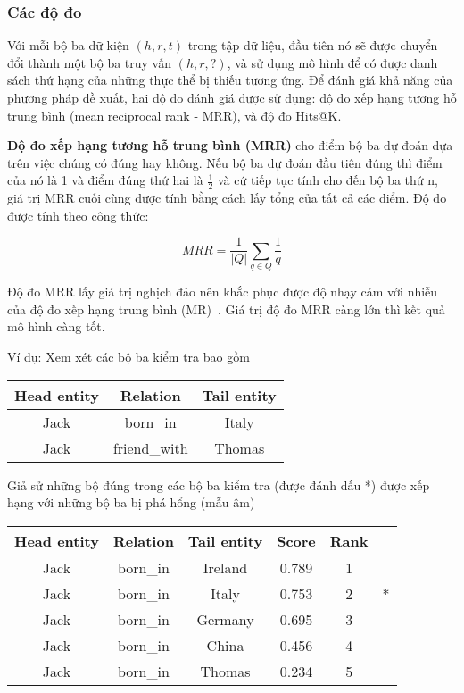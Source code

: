 \subsubsection{Các độ đo}

Với mỗi bộ ba dữ kiện $(h, r, t)$ trong tập dữ liệu, đầu tiên nó sẽ được chuyển đổi thành một bộ ba truy vấn $(h, r, ?)$, và sử dụng mô hình để có được danh sách thứ hạng của những thực thể bị thiếu tương ứng. Để đánh giá khả năng của phương pháp đề xuất, hai độ đo đánh giá được sử dụng: độ đo xếp hạng tương hỗ trung bình (mean reciprocal rank - MRR), và độ đo Hits@K.

\textbf{Độ đo xếp hạng tương hỗ trung bình (MRR)} cho điểm bộ ba dự đoán dựa trên việc chúng có đúng hay không. Nếu bộ ba dự đoán đầu tiên đúng thì điểm của nó là 1 và điểm đúng thứ hai là \(\frac{1}{2}\) và cứ tiếp tục tính cho đến bộ ba thứ n, giá trị MRR cuối cùng được tính bằng cách lấy tổng của tất cả các điểm. Độ đo được tính theo công thức:

\begin{equation}
\textit{MRR} = \frac{1}{|Q|} \sum_{q\in Q} \frac{1}{q}
\end{equation}

Độ đo MRR lấy giá trị nghịch đảo nên khắc phục được độ nhạy cảm với nhiễu của độ đo xếp hạng trung bình (MR)~\cite{talukdar2021okgit}. Giá trị độ đo MRR càng lớn thì kết quả mô hình càng tốt.

Ví dụ: Xem xét các bộ ba kiểm tra bao gồm

\begin{table}[H]
\centering
\begin{tabular}{ccc}
\hline
Head entity &  Relation & Tail entity \\
\hline
Jack  & born\_in  & Italy \\
Jack  & friend\_with  & Thomas \\
\hline
\end{tabular}
\end{table}

Giả sử những bộ đúng trong các bộ ba kiểm tra (được đánh dấu *) được xếp hạng với những bộ ba bị phá hổng (mẫu âm)

\begin{table}[H]
\centering
\begin{tabular}{cccccc}
\hline
Head entity &  Relation & Tail entity & Score & Rank & \\
\hline
Jack &  born\_in &  Ireland    &    0.789   &   1&\\
Jack &  born\_in &  Italy      &    0.753    &  2&  *\\
Jack &  born\_in &  Germany    &    0.695    &  3&\\
Jack &  born\_in &  China      &    0.456    &  4&\\
Jack &  born\_in &  Thomas     &    0.234    &  5&\\
\hline
\end{tabular}
\end{table}

